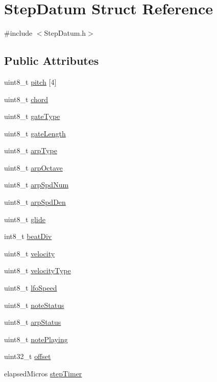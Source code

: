 \hypertarget{struct_step_datum}{}\section{Step\+Datum Struct Reference}
\label{struct_step_datum}


{\ttfamily \#include $<$Step\+Datum.\+h$>$}

\subsection*{Public Attributes}
\begin{DoxyCompactItemize}
\item 
uint8\+\_\+t \hyperlink{struct_step_datum_a3c078a14501abfba95ead98fcc573a0d}{pitch} \mbox{[}4\mbox{]}
\item 
uint8\+\_\+t \hyperlink{struct_step_datum_a713e1a0a1f82d0f0e0468c6ad7b61824}{chord}
\item 
uint8\+\_\+t \hyperlink{struct_step_datum_a8114d34d3527ac976e04900b00d32528}{gate\+Type}
\item 
uint8\+\_\+t \hyperlink{struct_step_datum_ac636a25482248cd65b2f3a96c3923f03}{gate\+Length}
\item 
uint8\+\_\+t \hyperlink{struct_step_datum_a876870c8304b3479d486118fc8038482}{arp\+Type}
\item 
uint8\+\_\+t \hyperlink{struct_step_datum_a70d708f662b7d8bdd891752f5207215d}{arp\+Octave}
\item 
uint8\+\_\+t \hyperlink{struct_step_datum_a5f3be2ba62e52473728da6cddc55efac}{arp\+Spd\+Num}
\item 
uint8\+\_\+t \hyperlink{struct_step_datum_a599c5be83a0701fb13067718396f10bd}{arp\+Spd\+Den}
\item 
uint8\+\_\+t \hyperlink{struct_step_datum_ae04506ea6a89a87a7372dd93e49cba58}{glide}
\item 
int8\+\_\+t \hyperlink{struct_step_datum_ab22b5bee8f263ac9f356e12ea4ff65ae}{beat\+Div}
\item 
uint8\+\_\+t \hyperlink{struct_step_datum_a84adb7c8fcc48652b0e2f31e71af0d63}{velocity}
\item 
uint8\+\_\+t \hyperlink{struct_step_datum_ad6e4e79031428052d5ca7460ebcc6e0d}{velocity\+Type}
\item 
uint8\+\_\+t \hyperlink{struct_step_datum_a3f7bbe94eb714b707856ab74cc818df6}{lfo\+Speed}
\item 
uint8\+\_\+t \hyperlink{struct_step_datum_a4e9534bf5d05809d9e357a782fca6c3c}{note\+Status}
\item 
uint8\+\_\+t \hyperlink{struct_step_datum_a801e42134086170dfa08564f7e5520a1}{arp\+Status}
\item 
uint8\+\_\+t \hyperlink{struct_step_datum_a6e3ba3b35129cd76d4ec7855ac505171}{note\+Playing}
\item 
uint32\+\_\+t \hyperlink{struct_step_datum_aeec21c2d1f2d88689a71f2aac01c2337}{offset}
\item 
elapsed\+Micros \hyperlink{struct_step_datum_ac12223e4eb5ad5888e79eac17cf2c3da}{step\+Timer}
\end{DoxyCompactItemize}


